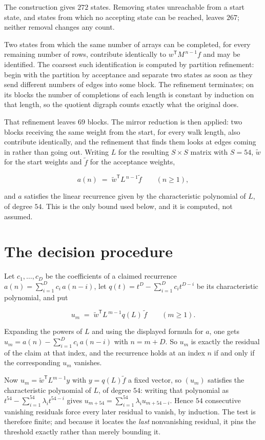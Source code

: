 \documentclass[11pt]{article}
\theoremstyle{definition}
\begin{document}
The construction gives $272$ states. Removing states unreachable from a start state, and states from which no accepting state can be reached, leaves $267$; neither removal changes any count.

Two states from which the same number of arrays can be completed, for every remaining number of rows, contribute identically to $w^{\mathsf T}M^{\,n-1}f$ and may be identified. The coarsest such identification is computed by partition refinement: begin with the partition by acceptance and separate two states as soon as they send different numbers of edges into some block. The refinement terminates; on its blocks the number of completions of each length is constant by induction on that length, so the quotient digraph counts exactly what the original does.

That refinement leaves $69$ blocks. The mirror reduction is then applied: two blocks receiving the same weight from the start, for every walk length, also contribute identically, and the refinement that finds them looks at edges coming in rather than going out. Writing $L$ for the resulting $S \times S$ matrix with $S = 54$, $\tilde w$ for the start weights and $\tilde f$ for the acceptance weights,

\[a(n) \;=\; \tilde w^{\mathsf T} L^{\,n-1} \tilde f \qquad (n \ge 1),\]

and $a$ satisfies the linear recurrence given by the characteristic polynomial of $L$, of degree $54$. This is the only bound used below, and it is computed, not assumed.

\section{The decision procedure}

Let $c_1,\dots,c_D$ be the coefficients of a claimed recurrence $a(n) = \sum_{i=1}^{D} c_i\,a(n-i)$, let $q(t) = t^{D} - \sum_{i=1}^{D} c_i t^{D-i}$ be its characteristic polynomial, and put

\[u_m \;=\; \tilde w^{\mathsf T} L^{\,m-1} q(L)\,\tilde f \qquad (m \ge 1).\]

Expanding the powers of $L$ and using the displayed formula for $a$, one gets $u_m = a(n) - \sum_{i=1}^{D} c_i\,a(n-i)$ with $n = m + D$. So $u_m$ is exactly the residual of the claim at that index, and the recurrence holds at an index $n$ if and only if the corresponding $u_m$ vanishes.

Now $u_m = \tilde w^{\mathsf T} L^{m-1} y$ with $y = q(L)\tilde f$ a fixed vector, so $(u_m)$ satisfies the characteristic polynomial of $L$, of degree $54$: writing that polynomial as $t^{54} - \sum_{i=1}^{54} \lambda_i t^{54-i}$ gives $u_{m+54} = \sum_{i=1}^{54} \lambda_i u_{m+54-i}$. Hence $54$ consecutive vanishing residuals force every later residual to vanish, by induction. The test is therefore finite; and because it locates the {\itshape last} nonvanishing residual, it pins the threshold exactly rather than merely bounding it.
\end{document}
